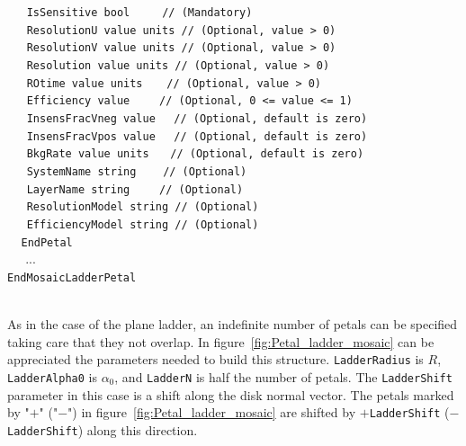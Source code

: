 $~~~~~~~${\tt IsSensitive      bool                          $~~~~~~~$   // (Mandatory)} \\
$~~~~~~~${\tt ResolutionU      value units                               // (Optional, value > 0)} \\
$~~~~~~~${\tt ResolutionV      value units                               // (Optional, value > 0)} \\
$~~~~~~~${\tt Resolution       value units                               // (Optional, value > 0)} \\
$~~~~~~~${\tt ROtime           value units                      $~~~~$   // (Optional, value > 0)} \\
$~~~~~~~${\tt Efficiency       value                          $~~~~~~$   // (Optional, 0 <= value <= 1)} \\
$~~~~~~~${\tt InsensFracVneg   value                              $~~$   // (Optional, default is zero)} \\
$~~~~~~~${\tt InsensFracVpos   value                              $~~$   // (Optional, default is zero)} \\
$~~~~~~~${\tt BkgRate          value units                       $~~~$   // (Optional, default is zero)} \\
$~~~~~~~${\tt SystemName       string                          $~~~~~$   // (Optional)} \\
$~~~~~~~${\tt LayerName        string                         $~~~~~~$   // (Optional)} \\
$~~~~~~~${\tt ResolutionModel  string                                    // (Optional)} \\
$~~~~~~~${\tt EfficiencyModel  string                                    // (Optional)} \\
$~~~~~${\tt EndPetal} \\
$~~~~~$ ... \\
{\tt EndMosaicLadderPetal}

~\\
As in the case of the plane ladder, an indefinite number of petals can be specified taking care that they not overlap. 
In figure~\ref{fig:Petal_ladder_mosaic} can be appreciated the parameters needed to build this structure. {\tt LadderRadius} 
is $R$, {\tt LadderAlpha0} is $\alpha_0$, and {\tt LadderN} is half the number of petals. The {\tt LadderShift} parameter in 
this case is a shift along the disk normal vector. The petals marked by "$+$" ("$-$") in figure~\ref{fig:Petal_ladder_mosaic}
are shifted by $+${\tt LadderShift} ($-${\tt LadderShift}) along this direction.

